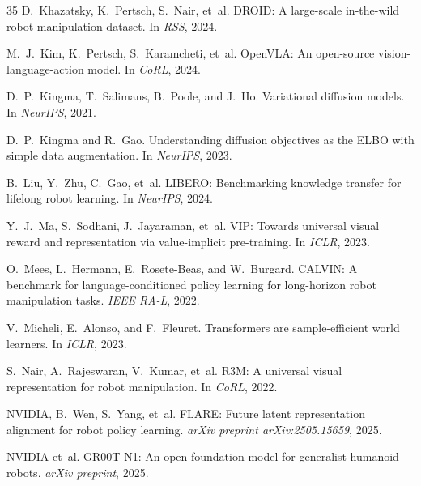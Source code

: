 \documentclass{article}
\begin{document}
\begin{thebibliography}{35}
D.~Khazatsky, K.~Pertsch, S.~Nair, et~al.
\newblock DROID: A large-scale in-the-wild robot manipulation dataset.
\newblock In \emph{RSS}, 2024.

M.~J.~Kim, K.~Pertsch, S.~Karamcheti, et~al.
\newblock OpenVLA: An open-source vision-language-action model.
\newblock In \emph{CoRL}, 2024.

D.~P.~Kingma, T.~Salimans, B.~Poole, and J.~Ho.
\newblock Variational diffusion models.
\newblock In \emph{NeurIPS}, 2021.

D.~P.~Kingma and R.~Gao.
\newblock Understanding diffusion objectives as the ELBO with simple data augmentation.
\newblock In \emph{NeurIPS}, 2023.

B.~Liu, Y.~Zhu, C.~Gao, et~al.
\newblock LIBERO: Benchmarking knowledge transfer for lifelong robot learning.
\newblock In \emph{NeurIPS}, 2024.

Y.~J.~Ma, S.~Sodhani, J.~Jayaraman, et~al.
\newblock VIP: Towards universal visual reward and representation via value-implicit pre-training.
\newblock In \emph{ICLR}, 2023.

O.~Mees, L.~Hermann, E.~Rosete-Beas, and W.~Burgard.
\newblock CALVIN: A benchmark for language-conditioned policy learning for long-horizon robot manipulation tasks.
\newblock \emph{IEEE RA-L}, 2022.

V.~Micheli, E.~Alonso, and F.~Fleuret.
\newblock Transformers are sample-efficient world learners.
\newblock In \emph{ICLR}, 2023.

S.~Nair, A.~Rajeswaran, V.~Kumar, et~al.
\newblock R3M: A universal visual representation for robot manipulation.
\newblock In \emph{CoRL}, 2022.

NVIDIA, B.~Wen, S.~Yang, et~al.
\newblock FLARE: Future latent representation alignment for robot policy learning.
\newblock \emph{arXiv preprint arXiv:2505.15659}, 2025.

NVIDIA et~al.
\newblock GR00T N1: An open foundation model for generalist humanoid robots.
\newblock \emph{arXiv preprint}, 2025.


\end{thebibliography}
\end{document}
